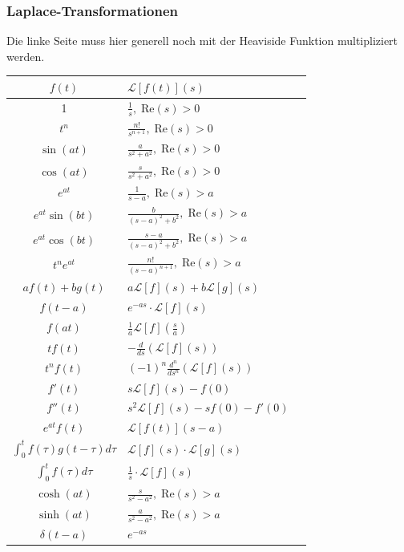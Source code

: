 \documentclass[a4paper,10pt]{article}
\def\Re{\text{Re}}
\begin{document}
\subsubsection{Laplace-Transformationen}

Die linke Seite muss hier generell noch mit der Heaviside Funktion multipliziert werden.

\begin{center}
  \begin{tabularx}{\linewidth}{c>{\centering\arraybackslash}Xc}
  \toprule
  $f(t)$ & $\mathcal{L}[f(t)](s)$ \\
  \midrule
  1 & $\frac{1}{s}, \; \Re(s) >  0$ \\
  $t^n$ & $\frac{n!}{s^{n+1}}, \; \Re(s) >  0$ \\
  $\sin(at)$ & $\frac{a}{s^2 + a^2}, \; \Re(s) >  0$ \\
  $\cos(at)$ & $\frac{s}{s^2 + a^2}, \; \Re(s) >  0$ \\
  $e^{at}$ & $\frac{1}{s-a}, \; \Re(s) >  a$ \\
  $e^{at} \sin(bt)$ & $\frac{b}{(s-a)^2 + b^2}, \; \Re(s) >  a$ \\
  $e^{at} \cos(bt)$ & $\frac{s-a}{(s-a)^2 + b^2}, \; \Re(s) >  a$ \\
  $t^n e^{at}$ & $\frac{n!}{(s-a)^{n+1}}, \; \Re(s) >  a$ \\
  $a f(t) + b g(t)$ & $a \mathcal{L}[f](s) + b \mathcal{L}[g](s)$ \\
  $f(t-a)$&$e^{-a s}\cdot \mathcal{L}[f](s)$ \\
  $f(at)$&$\frac1a \mathcal{L}[f](\frac{s}{a})$\\
  $t f(t)$ & $-\frac{d}{ds} \left( \mathcal{L}[f](s) \right)$ \\
  $t^n f(t)$ & $(-1)^n \frac{d^n}{ds^n} \left( \mathcal{L}[f](s) \right)$ \\
  $f'(t)$ & $s \mathcal{L}[f](s) - f(0)$ \\
  $f''(t)$ & $s^2 \mathcal{L}[f](s) - s f(0) - f'(0)$ \\
  $e^{at} f(t)$ & $\mathcal{L}[f(t)](s - a)$ \\
  $\int_0^t f(\tau) g(t-\tau) d\tau$ & $\mathcal{L}[f](s) \cdot \mathcal{L}[g](s)$ \\
  $\int_0^t f(\tau)d\tau$&$\frac{1}{s}\cdot \mathcal{L}[f](s)$\\
  $\cosh(at)$ & $\frac{s}{s^2 - a^2}, \; \Re(s) >  a$\\
  $\sinh(at)$ & $\frac{a}{s^2 - a^2}, \; \Re(s) >  a$\\
  $\delta(t - a)$ & $e^{-as}$\\
  \bottomrule
  \end{tabularx}
\end{center}
\end{document}
